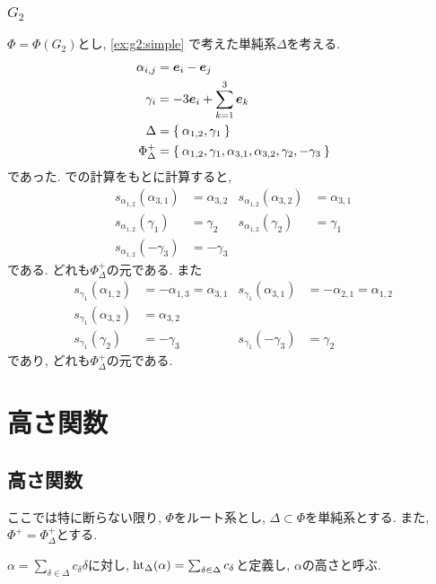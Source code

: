 \subsection{$G_2$}
$\Phi=\Phi(G_2)$とし,
\cref{ex:g2:simple}
で考えた単純系$\Delta$を考える.
\begin{align*}
  \alpha_{i,j}&=\boldsymbol{e}_i-\boldsymbol{e}_j\\
  \gamma_{i}&=-3\boldsymbol{e}_i+\sum_{k=1}^{3}\boldsymbol{e}_k\\
  \Delta&=\Set{\alpha_{1,2},\gamma_{1}}\\
  \Phi_\Delta^+ 
&=\Set{ \alpha_{1,2},\gamma_{1}, \alpha_{3,1},\alpha_{3,2},\gamma_{2},-\gamma_3}
\end{align*}
であった. での計算をもとに計算すると,
\begin{align*}
s_{\alpha_{1,2}}(\alpha_{3,1})&=\alpha_{3,2}
&s_{\alpha_{1,2}}(\alpha_{3,2})&=\alpha_{3,1}\\
s_{\alpha_{1,2}}(\gamma_1)&=\gamma_{2}&
s_{\alpha_{1,2}}(\gamma_2)&=\gamma_{1}\\
s_{\alpha_{1,2}}(-\gamma_3)&=-\gamma_{3}&
\end{align*}
である.  どれも$\Phi_\Delta^+$の元である.
また
\begin{align*}
  s_{\gamma_{1}}(\alpha_{1,2})&=-\alpha_{1,3}=\alpha_{3,1}
&s_{\gamma_{1}}(\alpha_{3,1})&=-\alpha_{2,1}=\alpha_{1,2}\\
s_{\gamma_{1}}(\alpha_{3,2})&=\alpha_{3,2}\\
s_{\gamma_{1}}(\gamma_2)&=-\gamma_{3}&
s_{\gamma_{1}}(-\gamma_3)&=\gamma_{2}
\end{align*}
であり, どれも$\Phi_\Delta^+$の元である.


\chapter{高さ関数}
\section{高さ関数}
ここでは特に断らない限り,
$\Phi$をルート系とし, $\Delta\subset\Phi$を単純系とする.
また, $\Phi^+=\Phi_\Delta^+$とする.
\begin{definition}
  $\alpha=\sum_{\delta\in\Delta}c_\delta \delta$に対し,
  $\operatorname{ht}_\Delta(\alpha)=\sum_{\delta\in\Delta}c_\delta$と定義し,
  $\alpha$の高さと呼ぶ.
\end{definition}

